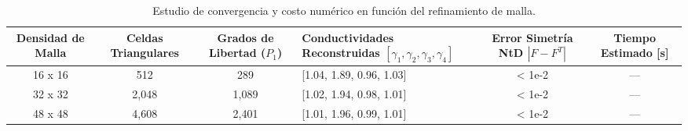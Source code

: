 \begin{table}[htbp]
  \centering
  \caption{Estudio de convergencia y costo numérico en función del refinamiento de malla.}
  \label{tab:mesh_convergence}
  \begin{tabular}{c c c p{5.5cm} c c}
    \hline\hline
    \textbf{Densidad de Malla} & \textbf{Celdas Triangulares} & \textbf{Grados de Libertad ($P_1$)} & \textbf{Conductividades Reconstruidas $[\gamma_1, \gamma_2, \gamma_3, \gamma_4]$} & \textbf{Error Simetría NtD $|F - F^T|$} & \textbf{Tiempo Estimado [s]} \\ \hline
    16 x 16 & 512 & 289 & [1.04, 1.89, 0.96, 1.03] & < 1e-2 & — \\ \hline
    32 x 32 & 2,048 & 1,089 & [1.02, 1.94, 0.98, 1.01] & < 1e-2 & — \\ \hline
    48 x 48 & 4,608 & 2,401 & [1.01, 1.96, 0.99, 1.01] & < 1e-2 & — \\ \hline
    \hline\hline
  \end{tabular}
\end{table}
